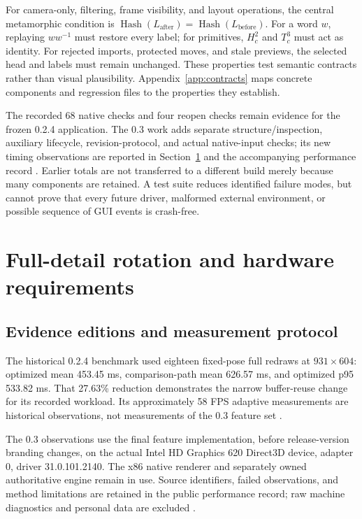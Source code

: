 \documentclass[a4paper,11pt]{article}
\begin{document}
For camera-only, filtering, frame visibility, and layout operations, the central metamorphic condition is \(\operatorname{Hash}(L_{\mathrm{after}})=\operatorname{Hash}(L_{\mathrm{before}})\). For a word \(w\), replaying \(ww^{-1}\) must restore every label; for primitives, \(H_c^2\) and \(T_c^3\) must act as identity. For rejected imports, protected moves, and stale previews, the selected head and labels must remain unchanged. These properties test semantic contracts rather than visual plausibility. Appendix~\ref{app:contracts} maps concrete components and regression files to the properties they establish.

The recorded 68 native checks and four reopen checks remain evidence for the frozen 0.2.4 application. The 0.3 work adds separate structure/inspection, auxiliary lifecycle, revision-protocol, and actual native-input checks; its new timing observations are reported in Section~\ref{sec:8} and the accompanying performance record \cite{performance03,structure03}. Earlier totals are not transferred to a different build merely because many components are retained. A test suite reduces identified failure modes, but cannot prove that every future driver, malformed external environment, or possible sequence of GUI events is crash-free.


\section{Full-detail rotation and hardware requirements}
\label{sec:8}

\subsection{Evidence editions and measurement protocol}

The historical 0.2.4 benchmark used eighteen fixed-pose full redraws at \(931\times604\): optimized mean 453.45 ms, comparison-path mean 626.57 ms, and optimized p95 533.82 ms. That 27.63\% reduction demonstrates the narrow buffer-reuse change for its recorded workload. Its approximately 58 FPS adaptive measurements are historical observations, not measurements of the 0.3 feature set \cite{validation}.

The 0.3 observations use the final feature implementation, before release-version branding changes, on the actual Intel HD Graphics 620 Direct3D device, adapter 0, driver 31.0.101.2140. The x86 native renderer and separately owned authoritative engine remain in use. Source identifiers, failed observations, and method limitations are retained in the public performance record; raw machine diagnostics and personal data are excluded \cite{performance03}.
\end{document}
